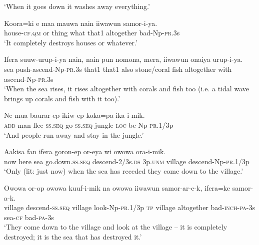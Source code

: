 \glt ‘When it goes down it washes away everything.’ \\
\z


\ea\label{ex:a:x10}
\gll  Koora=ki  e  maa  mauwa  nain  iiwawun  samor-i-ya. \\
house-\textsc{cf}.\textsc{qm}  or  thing  what  that1  altogether  bad-Np-\textsc{pr}.3s \\
\glt ‘It completely destroys houses or whatever.’ \\
\z


\ea\label{ex:a:x11}
\gll  Ifera  suuw-urup-i-ya  nain,  nain  pun  nomona,  mera,  iiwawun        onaiya  urup-i-ya. \\
sea  push-ascend-Np-\textsc{pr}.3s  that1  that1  also  stone/coral  fish  altogether  with  ascend-Np-\textsc{pr}.3s \\


\glt ‘When the sea rises, it rises altogether with corals and fish too (i.e. a tidal wave brings up corals and fish with it too).’ \\
\z


\ea\label{ex:a:x12}
\gll  Ne  mua  baurar-ep  ikiw-ep  koka=pa  ika-i-mik. \\
\textsc{add}  man  flee-\textsc{ss.seq}  go-\textsc{ss.seq}  jungle-\textsc{loc}  be-Np-\textsc{pr}.1/3p \\
\glt ‘And people run away and stay in the jungle.’ \\
\z


\ea\label{ex:a:x13}
\gll  Aakisa  fan  ifera  goron-ep  or-eya  wi  owowa            ora-i-mik. \\
now  here  sea  go.down.\textsc{ss.seq}  descend-2/3s.\textsc{ds}  3p.\textsc{unm}  village descend-Np-\textsc{pr}.1/3p \\


\glt ‘Only (lit: just now) when the sea has receded they come down to the village.’ \\
\z


\ea\label{ex:a:x14}
\gll  Owowa  or-op  owowa  kuuf-i-mik  na  owowa  iiwawun                  samor-ar-e-k,  ifera=ke  samor-a-k. \\
village  descend-\textsc{ss.seq}  village  look-Np-\textsc{pr}.1/3p  \textsc{tp}  village  altogether bad-\textsc{inch}-\textsc{pa}-3s  sea-\textsc{cf}  bad-\textsc{pa}-3s \\


\glt ‘They come down to the village and look at the village – it is completely destroyed; it is the sea that has destroyed it.’ \\
\z


